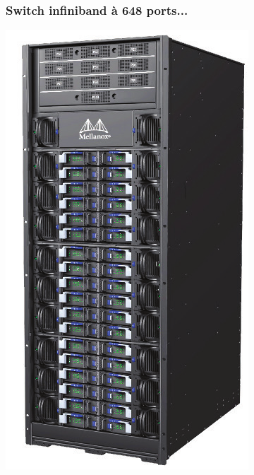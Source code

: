 \documentclass[xcolor={x11names,svgnames,psnames}]{beamer}
\begin{document}
\begin{frame}
  \frametitle{Switch infiniband à 648 ports...}
  \centering
  \includegraphics[height=0.75\textheight]{infiniband.png}
\end{frame}

\end{document}
